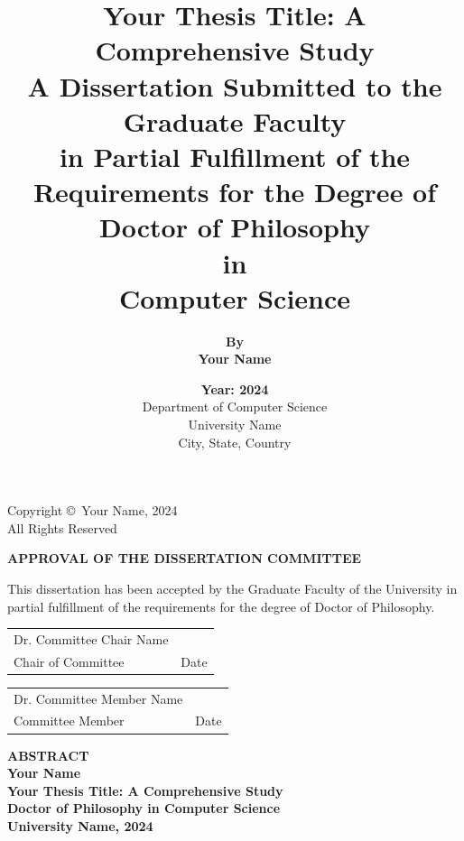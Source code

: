 \documentclass[12pt,oneside]{book}
\title{
  \fontsize{16pt}{\baselineskip}\textbf{Your Thesis Title: A Comprehensive Study}\\[2cm]
  \fontsize{14pt}{\baselineskip}A Dissertation Submitted to the Graduate Faculty\\
  in Partial Fulfillment of the Requirements for the Degree of\\[0.5cm]
  \fontsize{14pt}{\baselineskip}\textbf{Doctor of Philosophy}\\[0.5cm]
  \fontsize{12pt}{\baselineskip}in\\[0.5cm]
  \fontsize{12pt}{\baselineskip}\textbf{Computer Science}
}
\author{
  \fontsize{14pt}{\baselineskip}\textbf{By}\\[0.5cm]
  \fontsize{14pt}{\baselineskip}\textbf{Your Name}\\[2cm]
}
\date{
  \fontsize{12pt}{\baselineskip}\textbf{Year: 2024}\\[1cm]
  \fontsize{12pt}{\baselineskip}Department of Computer Science\\
  University Name\\
  City, State, Country
}
\theoremstyle{plain}
\theoremstyle{definition}
\begin{document}
\frontmatter
{}

\maketitle

\thispagestyle{empty}
\vspace*{\fill}
\begin{center}
Copyright \copyright\ Your Name, 2024\\
All Rights Reserved
\end{center}
\vspace*{\fill}
\clearpage

\thispagestyle{empty}
\vspace*{3cm}
\begin{center}
\textbf{APPROVAL OF THE DISSERTATION COMMITTEE}
\end{center}
\vspace{1cm}

\begin{center}
This dissertation has been accepted by the Graduate Faculty of the University in partial fulfillment of the requirements for the degree of Doctor of Philosophy.
\end{center}

\vspace{2cm}

\begin{center}
\begin{tabular}{lr}
\hline
Dr. Committee Chair Name & \hspace{2in} \\
Chair of Committee & Date \\
\end{tabular}
\end{center}

\vspace{1cm}

\begin{center}
\begin{tabular}{lr}
\hline
Dr. Committee Member Name & \hspace{2in} \\
Committee Member & Date \\
\end{tabular}
\end{center}

\clearpage

\begin{center}
\textbf{ABSTRACT}\\[1cm]
\textbf{Your Name}\\
\textbf{Your Thesis Title: A Comprehensive Study}\\[0.5cm]
\textbf{Doctor of Philosophy in Computer Science}\\[0.5cm]
\textbf{University Name, 2024}
\end{center}
\end{document}
